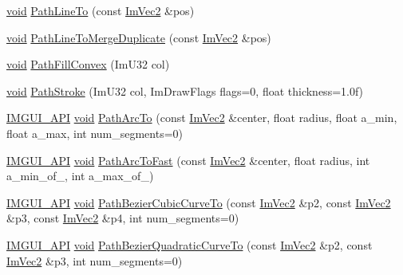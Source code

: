 \begin{DoxyCompactItemize}
\hyperlink{imgui__impl__opengl3__loader_8h_ac668e7cffd9e2e9cfee428b9b2f34fa7}{void} \hyperlink{structImDrawList_a828d944325ed58d8b57abd3647bffaaf}{Path\+Line\+To} (const \hyperlink{structImVec2}{Im\+Vec2} \&pos)
\item 
\hyperlink{imgui__impl__opengl3__loader_8h_ac668e7cffd9e2e9cfee428b9b2f34fa7}{void} \hyperlink{structImDrawList_aa3dd11945fb62495f8b9e1392ed724e3}{Path\+Line\+To\+Merge\+Duplicate} (const \hyperlink{structImVec2}{Im\+Vec2} \&pos)
\item 
\hyperlink{imgui__impl__opengl3__loader_8h_ac668e7cffd9e2e9cfee428b9b2f34fa7}{void} \hyperlink{structImDrawList_aea9301cb99ebf4b27f5d3959017567c9}{Path\+Fill\+Convex} (Im\+U32 col)
\item 
\hyperlink{imgui__impl__opengl3__loader_8h_ac668e7cffd9e2e9cfee428b9b2f34fa7}{void} \hyperlink{structImDrawList_a60bf9040ef3d09b39c4ba8f5a2a68ae9}{Path\+Stroke} (Im\+U32 col, Im\+Draw\+Flags flags=0, float thickness=1.\+0f)
\item 
\hyperlink{imgui_8h_a43829975e84e45d1149597467a14bbf5}{I\+M\+G\+U\+I\+\_\+\+A\+PI} \hyperlink{imgui__impl__opengl3__loader_8h_ac668e7cffd9e2e9cfee428b9b2f34fa7}{void} \hyperlink{structImDrawList_af86073403f1557cccb4ff45dfad0a74a}{Path\+Arc\+To} (const \hyperlink{structImVec2}{Im\+Vec2} \&center, float radius, float a\+\_\+min, float a\+\_\+max, int num\+\_\+segments=0)
\item 
\hyperlink{imgui_8h_a43829975e84e45d1149597467a14bbf5}{I\+M\+G\+U\+I\+\_\+\+A\+PI} \hyperlink{imgui__impl__opengl3__loader_8h_ac668e7cffd9e2e9cfee428b9b2f34fa7}{void} \hyperlink{structImDrawList_a6d307c6de1a6522e76fa410e8fe96fcc}{Path\+Arc\+To\+Fast} (const \hyperlink{structImVec2}{Im\+Vec2} \&center, float radius, int a\+\_\+min\+\_\+of\+\_, int a\+\_\+max\+\_\+of\+\_)
\item 
\hyperlink{imgui_8h_a43829975e84e45d1149597467a14bbf5}{I\+M\+G\+U\+I\+\_\+\+A\+PI} \hyperlink{imgui__impl__opengl3__loader_8h_ac668e7cffd9e2e9cfee428b9b2f34fa7}{void} \hyperlink{structImDrawList_a48358bf6904dfd09906c6bfa3ef88777}{Path\+Bezier\+Cubic\+Curve\+To} (const \hyperlink{structImVec2}{Im\+Vec2} \&p2, const \hyperlink{structImVec2}{Im\+Vec2} \&p3, const \hyperlink{structImVec2}{Im\+Vec2} \&p4, int num\+\_\+segments=0)
\item 
\hyperlink{imgui_8h_a43829975e84e45d1149597467a14bbf5}{I\+M\+G\+U\+I\+\_\+\+A\+PI} \hyperlink{imgui__impl__opengl3__loader_8h_ac668e7cffd9e2e9cfee428b9b2f34fa7}{void} \hyperlink{structImDrawList_af48c5212d06ca5967f70da33ffadbc86}{Path\+Bezier\+Quadratic\+Curve\+To} (const \hyperlink{structImVec2}{Im\+Vec2} \&p2, const \hyperlink{structImVec2}{Im\+Vec2} \&p3, int num\+\_\+segments=0)

\end{DoxyCompactItemize}

